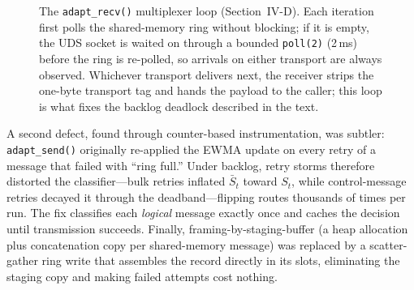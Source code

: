 \documentclass[conference]{IEEEtran}
\newcommand{\sbar}{\bar{S}}
\begin{document}
\begin{figure}[t]
\centering
{}
\caption{The \texttt{adapt\_recv()} multiplexer loop
(Section~IV-D). Each iteration first polls the shared-memory ring without
blocking; if it is empty, the UDS socket is waited on through a bounded
\texttt{poll(2)} (2\,ms) before the ring is re-polled, so arrivals on
either transport are always observed. Whichever transport delivers next,
the receiver strips the one-byte transport tag and hands the payload to
the caller; this loop is what fixes the backlog deadlock described in the
text.}
\label{fig:mux}
\end{figure}


A second defect, found through counter-based instrumentation, was subtler:
\texttt{adapt\_send()} originally re-applied the EWMA update on every
retry of a message that failed with ``ring full.'' Under backlog, retry
storms therefore distorted the classifier---bulk retries inflated
$\sbar_t$ toward $S_t$, while control-message retries decayed it through
the deadband---flipping routes thousands of times per run. The fix classifies
each \emph{logical} message exactly once and caches the decision until
transmission succeeds. Finally, framing-by-staging-buffer (a heap allocation
plus concatenation copy per shared-memory message) was replaced by a
scatter-gather ring write that assembles the record directly in its slots,
eliminating the staging copy and making failed attempts cost nothing.
\end{document}

